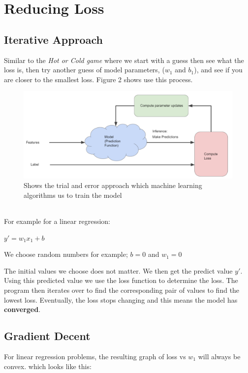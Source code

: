\documentclass[12pt]{article}
\begin{document}
\section{Reducing Loss}
\subsection{Iterative Approach}
Similar to the \textit{Hot or Cold game} where we start with a guess then see what the loss is, then try another guess of model parameters, ($w_1$ and $b_1$), and see if you are closer to the smallest loss. Figure 2 shows use this process.
\begin{figure}[hbt!]
\includegraphics[scale = 0.5]{imgs/Iterative Approach.PNG}
\centering
\caption{Shows the trial and error approach which machine learning algorithms us to train the model}
\end{figure}
\\For example for a linear regression:
\begin{center}
$y' = w_1x_1 + b$
\end{center}

We choose random numbers for example;
$b = 0$ and $w_1 = 0$

The initial values we choose does not matter. We then get the predict value $y'$. Using this predicted value we use the loss function to determine the loss. The program then iterates over to find the corresponding pair of values to find the lowest loss. Eventually, the loss stops changing and this means the model has \textbf{converged}.

\subsection{Gradient Decent}
For linear regression problems, the resulting graph of loss vs $w_1$ will always be convex. which looks like this:
\end{document}
